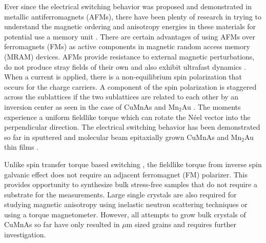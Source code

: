 \documentclass[letterpaper,10pt,doublespacing,edeposit]{uiucthesis2020}
\begin{document}
\begin{mainmatter}
Ever since the electrical switching behavior was proposed \cite{Zelezny2014} and demonstrated \cite{Wadley2016} in metallic antiferromagnets (AFMs), there have been plenty of research in trying to understand the magnetic ordering and anisotropy energies in these materials for potential use a memory unit \cite{Grzybowski2017,Bodnar2019,Wadley2013,Hills2015,Wadley2015,Saidl2017,Yang2020}. There are certain advantages of using AFMs over ferromagnets (FMs) as active components in magnetic random access memory (MRAM) devices. AFMs provide resistance to external magnetic perturbations, do not produce stray fields of their own and also exhibit ultrafast dynamics \cite{Wadley2016}. When a current is applied, there is a non-equilibrium spin polarization that occurs for the charge carriers. A component of the spin polarization is staggered across the sublattices if the two sublattices are related to each other by an inversion center as seen in the case of CuMnAs and Mn$_2$Au \cite{Zelezny2014,Zelezny2017}. The moments experience a uniform fieldlike torque which can rotate the N\'eel vector into the perpendicular direction. The electrical switching behavior has been demonstrated so far in sputtered and molecular beam epitaxially grown CuMnAs and Mn$_2$Au thin films \cite{Wadley2016,Meinert2018,Matalla-Wagner2019}. 

Unlike spin transfer torque based switching \cite{Gomonay2010}, the fieldlike torque from inverse spin galvanic effect does not require an adjacent ferromagnet (FM) polarizer. This provides opportunity to synthesize bulk stress-free samples that do not require a substrate for the measurements. Large single crystals are also required for studying magnetic anisotropy using inelastic neutron scattering techniques or using a torque magnetometer\cite{Karigerasi2020,Yang2020}. However, all attempts to grow bulk crystals of CuMnAs so far have only resulted in $\mu$m sized grains \cite{Volny2020} and requires further investigation.


\end{mainmatter}
\end{document}
